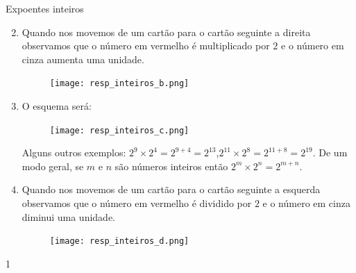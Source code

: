 \begin{answer}{Expoentes inteiros}
{
\begin{enumerate}\setcounter{enumi}{1}

\item
Quando nos movemos de um cartão para o cartão seguinte a direita observamos que o número em vermelho é multiplicado por $2$ e o número em cinza aumenta uma unidade.

\begin{figure}[H]
\centering
\noindent\texttt{[image: resp\_inteiros\_b.png]}
\end{figure}

\item
O esquema será:

\begin{figure}[H]
\centering
\noindent\texttt{[image: resp\_inteiros\_c.png]}
\end{figure}

Alguns outros exemplos: $2^{9} \times 2^{4} =2^{9+4}=2^{13}$,\quad $2^{11} \times 2^8=2^{11+8}=2^{19}$. De um modo geral, se $m$ e $n$ são números inteiros então $2^m \times 2^n = 2^{m+n}$.

\item Quando nos movemos de um cartão para o cartão seguinte a esquerda observamos que o número em vermelho é dividido por $2$ e o número em cinza diminui uma unidade.

\begin{figure}[H]
\centering
\noindent\texttt{[image: resp\_inteiros\_d.png]}
\end{figure}


\end{enumerate}
}{1}
\end{answer}
